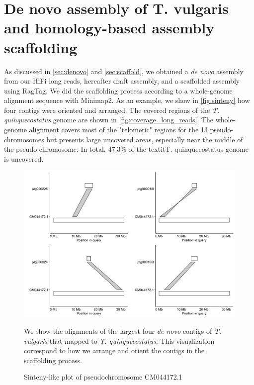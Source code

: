 \section{De novo assembly of T. vulgaris and homology-based assembly scaffolding}

As discussed in \autoref{sec:denovo} and \autoref{sec:scaffold}, we obtained a \textit{de novo} assembly from our \ac{HiFi} long reads, hereafter draft assembly, and a scaffolded assembly using RagTag. We did the scaffolding process according to a whole-genome alignment sequence with Minimap2. As an example, we show in \autoref{fig:sinteny} how four contigs were oriented and arranged. The covered regions of the \textit{T. quinquecostatus} genome are shown in \autoref{fig:coverage_long_reads}. The whole-genome alignment covers most of the "telomeric" regions for the 13 pseudo-chromosomes but presents large uncovered areas, especially near the middle of the pseudo-chromosome. In total, 47.3\% of the textit{T. quinquecostatus} genome is uncovered. \\

\begin{figure}
    \centering
    \includegraphics[width=\textwidth]{gfx/CM044172.1_sinteny.pdf}
    \caption{Sinteny-like plot of pseudochromosome CM044172.1}  
    \small
    We show the alignments of the largest four \textit{de novo} contigs of \textit{T. vulgaris} that mapped to \textit{T. quinquecostatus}. This visualization correspond to how we arrange and orient the contigs in the scaffolding process. 
    \label{fig:sinteny}
\end{figure} 

